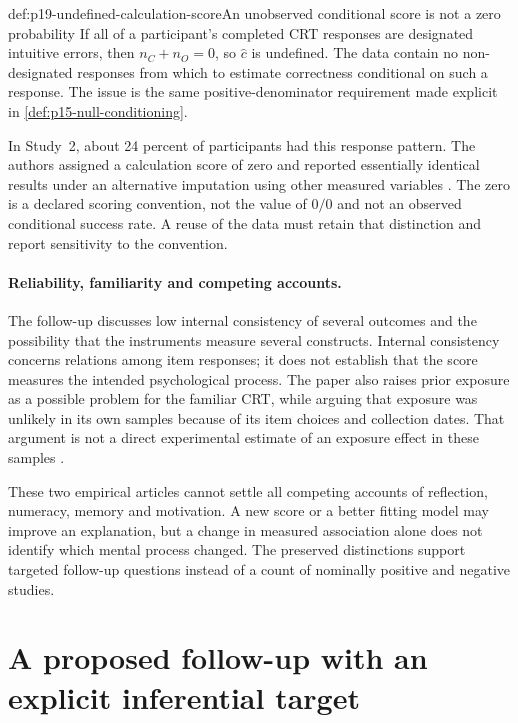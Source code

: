 \begin{hbwarning}{def:p19-undefined-calculation-score}{An unobserved conditional score is not a zero probability}
If all of a participant's completed CRT responses are designated intuitive
errors, then \(n_C+n_O=0\), so \(\widehat c\) is undefined. The data contain
no non-designated responses from which to estimate correctness conditional on
such a response. The issue is the same positive-denominator requirement made
explicit in \cref{def:p15-null-conditioning}.

In Study~2, about 24 percent of participants had this response pattern. The
authors assigned a calculation score of zero and reported essentially identical
results under an alternative imputation using other measured variables
\cite[p.~9 and notes~2--3]{SinayevPeters2015Calculation}.
The zero is a declared scoring convention, not the value of \(0/0\) and not
an observed conditional success rate. A reuse of the data must retain that
distinction and report sensitivity to the convention.
\end{hbwarning}

\paragraph{Reliability, familiarity and competing accounts.}
The follow-up discusses low internal consistency of several outcomes and the
possibility that the instruments measure several constructs. Internal
consistency concerns relations among item responses; it does not establish
that the score measures the intended psychological process. The paper also
raises prior exposure as a possible problem for the familiar CRT, while arguing
that exposure was unlikely in its own samples because of its item choices and
collection dates. That argument is not a direct experimental estimate of an
exposure effect in these samples \cite[pp.~7--9, 12--14]{SinayevPeters2015Calculation}.

These two empirical articles cannot settle all competing accounts of reflection,
numeracy, memory and motivation. A new score or a better fitting model may
improve an explanation, but a change in measured association alone does not
identify which mental process changed. The preserved distinctions support
targeted follow-up questions instead of a count of nominally positive and
negative studies.

\section{A proposed follow-up with an explicit inferential target}
\label{sec:p19-proposed-design}

